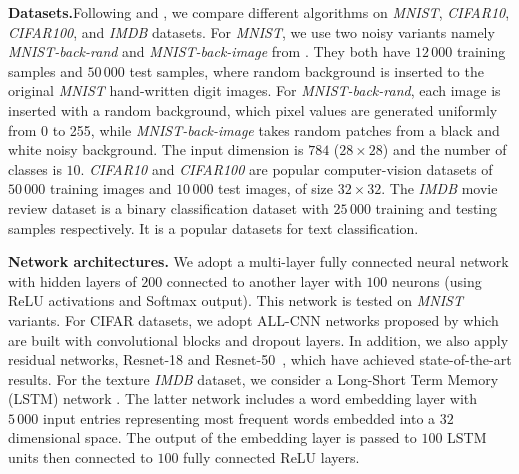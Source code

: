 \documentclass[twoside]{article}
\begin{document}

\textbf{Datasets.}\hspace{0.1in}Following \cite{RKK18} and \cite{KB15}, we compare different algorithms on \textit{MNIST}, \textit{CIFAR10},
\textit{CIFAR100}, and \textit{IMDB} datasets. 
For \textit{MNIST}, we use two noisy variants namely \textit{MNIST-back-rand} and \textit{MNIST-back-image} from \cite{MNIST07}. 
They both have $12\,000$ training samples and $50\,000$ test samples, where random background is inserted to the original \textit{MNIST} hand-written digit images. 
For \textit{MNIST-back-rand}, each image is inserted with a random background, which pixel values are generated uniformly from 0 to 255, while \textit{MNIST-back-image} takes random patches from a black and white noisy background.
The input dimension is $784$ ($28\times 28$) and the number of classes is $10$. 
\textit{CIFAR10} and \textit{CIFAR100} are popular computer-vision datasets of $50\,000$ training images and $10\,000$ test images, of size $32\times 32$. 
The \textit{IMDB} movie review dataset is a binary classification dataset with $25\,000$ training and testing samples respectively. 
It is a popular datasets for text classification.

\textbf{Network architectures.} We adopt a multi-layer fully connected neural network with hidden layers of $200$ connected to another layer with $100$ neurons (using \textrm{ReLU} activations and \textrm{Softmax} output). 
This network is tested on \textit{MNIST} variants.
For CIFAR datasets, we adopt ALL-CNN networks proposed by \citep{CNN15} which are built with convolutional blocks and dropout layers.
 In addition, we also apply residual networks, Resnet-18 and Resnet-50~\citep{Rnet16}, which have achieved state-of-the-art results.
For the texture \textit{IMDB} dataset, we consider a Long-Short Term Memory (LSTM) network \citep{gers1999learning}.
The latter network includes a word embedding layer with $5\,000$ input entries representing most frequent words embedded into a $32$ dimensional space. 
The output of the embedding layer is passed to $100$ LSTM units then connected to $100$ fully connected \textrm{ReLU} layers. 
\end{document}
